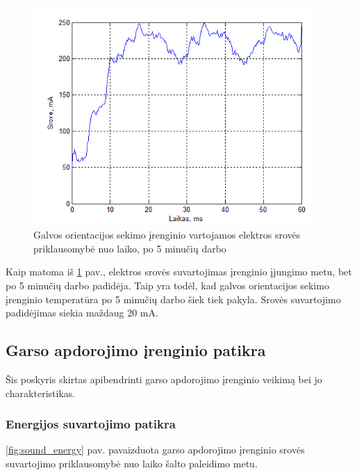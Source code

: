 \documentclass[]{vgtuef}
\begin{document}
\begin{figure}[htbp]
  \centering
  \includegraphics[width=400px]{img/head_tracker_5min.png}
  \caption{Galvos orientacijos sekimo įrenginio vartojamos elektros srovės priklausomybė nuo laiko, po 5 minučių darbo}
  \label{fig:headtracker_5min}
\end{figure}

Kaip matoma iš \ref{fig:headtracker_5min} pav., elektros srovės suvartojimas įrenginio įjungimo metu, bet po 5 minučių darbo padidėja. Taip yra todėl, kad galvos orientacijos sekimo įrenginio temperatūra po 5 minučių darbo šiek tiek pakyla. Srovės suvartojimo padidėjimas siekia maždaug 20 mA.

\subsection{Garso apdorojimo įrenginio patikra}

Šis poskyris skirtas apibendrinti garso apdorojimo įrenginio veikimą bei jo charakteristikas.

\subsubsection{Energijos suvartojimo patikra}

\ref{fig:sound_energy} pav. pavaizduota garso apdorojimo įrenginio srovės suvartojimo priklausomybė nuo laiko šalto paleidimo metu.
\end{document}
